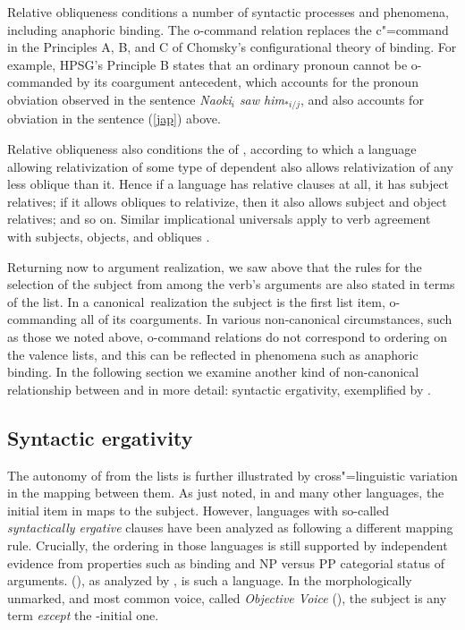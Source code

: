 \documentclass[output=paper
 	        ,biblatex
                ,babelshorthands
                ,newtxmath
                ,draftmode
                ,colorlinks, citecolor=brown
]{langscibook}
\begin{document}
Relative obliqueness conditions a number of syntactic processes and phenomena, including anaphoric
binding.  The o-command relation replaces the c"=command in the Principles A, B, and C of Chomsky's
\citeyearpar{Chomsky:1981} configurational theory of binding.  For example, HPSG's Principle B
states that an ordinary pronoun cannot be o-commanded by its coargument antecedent, which accounts
for the pronoun obviation observed in the  sentence \textit{Naoki$_i$ saw
  him$_{*i/j}$}, and also accounts for obviation in the  sentence (\ref{jap}) above.

Relative obliqueness also conditions the  of
\citet{KeenanandComrie1977}, according to which a language allowing relativization of some type of
dependent also allows relativization of any  less oblique than it.  Hence if a language has relative
clauses at all, it has subject relatives; if it allows obliques to relativize, then it also allows
subject and object relatives; and so on. Similar implicational universals apply to verb agreement
with subjects, objects, and obliques \citep{greenberg:1966}. 

Returning now to argument realization, we saw above that the rules for the selection of the subject
from among the verb's arguments are also stated in terms of the \argst list.  In a canonical\
realization the subject is the first list item, o-commanding all of its coarguments.
In various non-canonical circumstances, such as those we noted above, o-command relations do not
correspond to ordering on the valence lists, and this can be reflected in phenomena such as
anaphoric binding.  In the following section we examine another kind of non-canonical relationship
between \argst and \changed{valence} in more detail: syntactic ergativity, exemplified by .

\subsection{Syntactic ergativity}
\label{ergativity}\label{arg-st-sec-ergativity}

 The autonomy of \argst from the  lists is further illustrated by
cross"=linguistic variation in the mapping between them.  As just noted, in \ili{English} and many
other languages, the initial item in \argst maps to the subject.  However, languages with so-called
\emph{syntactically ergative} clauses have been analyzed as following a different mapping rule.
Crucially, the \argst ordering in those languages is still supported by independent evidence from
properties such as binding and NP versus PP categorial status of arguments.  \ili{Balinese}
(\ili{Austronesian}), as analyzed by \citet{Wechsler+Arka:1998}, is such a language.  In the
morphologically unmarked, and most common voice, called \emph{Objective Voice}
(\feat{ov}), the subject is any term \textit{except} the \argst-initial one.
\end{document}

